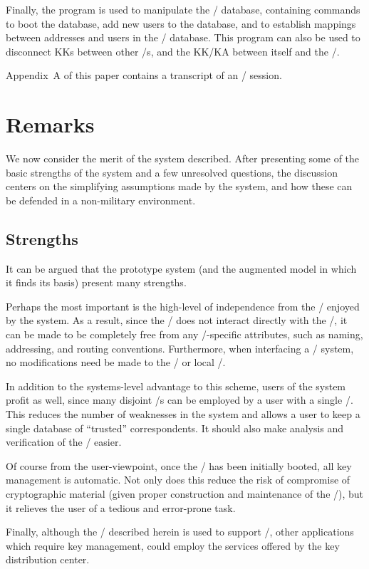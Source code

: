 Finally,
the  program is used to manipulate the \TMA/ database,
containing commands to boot the database,
add new users to the database,
and to establish mappings between addresses and users in the \TMA/ database.
This program can also be used to disconnect KKs between other \TMA/s,
and the KK/KA between itself and the \KDS/.

Appendix~A of this paper contains a transcript of an \MH/ session.

\section{Remarks}
We now consider the merit of the system described.
After presenting some of the basic strengths of the system
and a few unresolved questions,
the discussion centers on the simplifying assumptions made by the system,
and how these can be defended in a non-military environment.

\subsection{Strengths}
It can be argued that the prototype system
(and the augmented model in which it finds its basis)
present many strengths.

Perhaps the most important is the high-level of independence from the \MTS/
enjoyed by the system.
As a result,
since the \TMA/ does not interact directly with the \MTS/,
it can be made to be completely free from any \MTS/-specific attributes,
such as naming, addressing, and routing conventions.
Furthermore,
when interfacing a \trustedmail/ system,
no modifications need be made to the \MTS/ or local \MTA/.

In addition to the systems-level advantage to this scheme,
users of the system profit as well,
since many disjoint \MTS/s can be employed by a user with a single \TMA/.
This reduces the number of weaknesses in the system and allows a user to keep
a single database of ``trusted'' correspondents.
It should also make analysis and verification of the \TMA/ easier.

Of course from the user-viewpoint,
once the \TMA/ has been initially booted,
all key management is automatic.
Not only does this reduce the risk of compromise of cryptographic material
(given proper construction and maintenance of the \TMA/),
but it relieves the user of a tedious and error-prone task.

Finally,
although the \KDS/ described herein is used to support \trustedmail/,
other applications which require key management,
could employ the services offered by the key distribution center.

